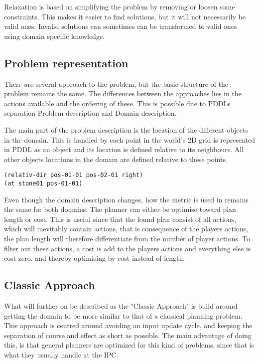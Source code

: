 	Relaxation is based on simplifying the problem by removing or loosen some constraints. This makes it easier to find solutions, but it will not necessarily be valid ones. Invalid solutions can sometimes can be transformed to valid ones using domain specific knowledge.
	
		\subsection{Problem representation}
		There are several approach to the problem, but the basic structure of the problem remains the same. The differences between the approaches lies in the actions available and the ordering of these. This is possible due to PDDLs separation Problem description and Domain description.
		
		The main part of the problem description is the location of the different objects in the domain. This is handled by each point in the world's 2D grid is represented in PDDL as an object and its location is defined relative to its neighbours. All other objects locations in the domain are defined relative to these points.
		\begin{lstlisting}
(relativ-dir pos-01-01 pos-02-01 right)
(at stone01 pos-01-01)
		\end{lstlisting}
		

		
		Even though the domain description changes, how the metric is used in remains the same for both domains. The planner can either be optimise toward plan length or cost. This is useful since that the found plan consist of all actions, which will inevitably contain actions, that is consequence of the players actions, the plan length will therefore differentiate from the number of player actions. To filter out these actions, a cost is add to the players actions and everything else is cost zero. and thereby optimising by cost instead of length.
	
		
		\subsection{Classic Approach}
		What will further on be described as the "Classic Approach" is build around getting the domain to be more similar to that of a classical planning problem. 
		This approach is centred around avoiding an input update cycle, and keeping the separation of course and effect as short as possible. The main advantage of doing this, is that general planners are optimized for this kind of problems, since that is what they usually handle at the IPC.
		
